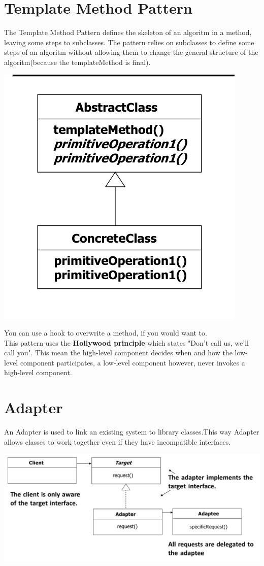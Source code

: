 \documentclass{report}
\begin{document}
   	\chapter{Template Method Pattern}
   		The Template Method Pattern defines the skeleton of an algoritm in a method, leaving some steps to subclasses. The pattern relies on subclasses to define some steps of an algoritm without allowing them to change the general structure of the algoritm(because the templateMethod is final). 
   		\begin{center}
   			\includegraphics[scale=0.6]{template_method}
   		\end{center} 
   		You can use a hook to overwrite a method, if you would want to. 
   		\\
   		This pattern uses the \textbf{Hollywood principle} which states "Don't call us, we'll call you". This mean the high-level component decides when and how the low-level component participates, a low-level component however, never invokes a high-level component.
	\chapter{Adapter}
		An Adapter is used to link an existing system to library classes.This way Adapter allows classes to work together even if they have incompatible interfaces.
		\begin{center}
			\includegraphics[scale=0.3]{adapter}
		\end{center} 
\end{document}
